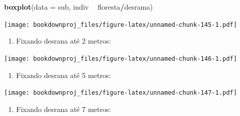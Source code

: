 \documentclass[
]{article}
\newenvironment{Shaded}{\begin{snugshade}}{\end{snugshade}}
\newcommand{\DataTypeTok}[1]{\textcolor[rgb]{0.13,0.29,0.53}{#1}}
\newcommand{\DecValTok}[1]{\textcolor[rgb]{0.00,0.00,0.81}{#1}}
\newcommand{\KeywordTok}[1]{\textcolor[rgb]{0.13,0.29,0.53}{\textbf{#1}}}
\newcommand{\NormalTok}[1]{#1}
\newcommand{\OperatorTok}[1]{\textcolor[rgb]{0.81,0.36,0.00}{\textbf{#1}}}
\newcommand{\StringTok}[1]{\textcolor[rgb]{0.31,0.60,0.02}{#1}}
\providecommand{\tightlist}{%
  \setlength{\itemsep}{0pt}\setlength{\parskip}{0pt}}
\begin{document}
\begin{Shaded}
\begin{Highlighting}[]
\KeywordTok{boxplot}\NormalTok{(}\DataTypeTok{data =}\NormalTok{ sub, indiv }\OperatorTok{~}\StringTok{ }\NormalTok{floresta}\OperatorTok{/}\NormalTok{desrama)}
\end{Highlighting}
\end{Shaded}

\texttt{[image: bookdownproj\_files/figure-latex/unnamed-chunk-145-1.pdf]}

\begin{enumerate}
\def\labelenumi{\arabic{enumi}.}
\setcounter{enumi}{3}
\tightlist
\item
  Fixando desrana até 2 metros:
\end{enumerate}

\begin{Shaded}
\end{Shaded}

\texttt{[image: bookdownproj\_files/figure-latex/unnamed-chunk-146-1.pdf]}

\begin{enumerate}
\def\labelenumi{\arabic{enumi}.}
\setcounter{enumi}{4}
\tightlist
\item
  Fixando desrana até 5 metros:
\end{enumerate}

\begin{Shaded}
\end{Shaded}

\texttt{[image: bookdownproj\_files/figure-latex/unnamed-chunk-147-1.pdf]}

\begin{enumerate}
\def\labelenumi{\arabic{enumi}.}
\setcounter{enumi}{5}
\tightlist
\item
  Fixando desrana até 7 metros:
\end{enumerate}
\end{document}
